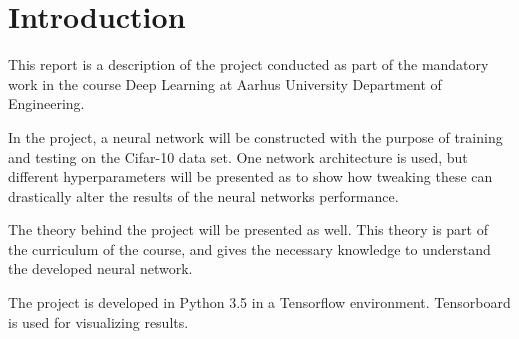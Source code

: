 \chapter{Introduction}
\label{chp:intro}

This report is a description of the project conducted as part of the mandatory work in the course Deep Learning at Aarhus University Department of Engineering.

In the project, a neural network will be constructed with the purpose of training and testing on the Cifar-10 data set. One network architecture is used, but different hyperparameters will be presented as to show how tweaking these can drastically alter the results of the neural networks performance. 

The theory behind the project will be presented as well. This theory is part of the curriculum of the course, and gives the necessary knowledge to understand the developed neural network. 

The project is developed in Python 3.5 in a Tensorflow environment. Tensorboard is used for visualizing results. 